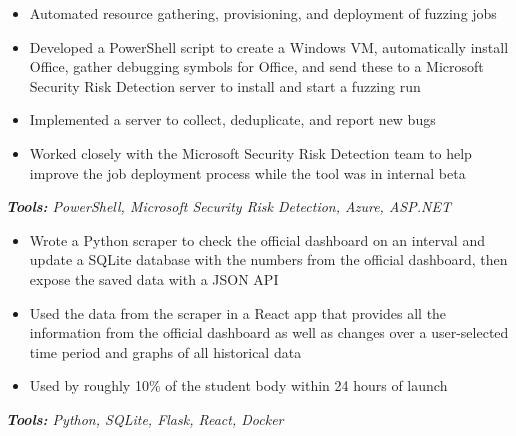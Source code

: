 \documentclass[10pt,letter]{altacv}
\begin{document}
\begin{itemize}
\item Automated resource gathering, provisioning, and deployment of fuzzing jobs
\item Developed a PowerShell script to create a Windows VM, automatically install Office, gather debugging symbols for Office, and send these to a Microsoft \\ Security Risk Detection server to install and start a fuzzing run
\item Implemented a server to collect, deduplicate, and report new bugs
\item Worked closely with the Microsoft Security Risk Detection team to help improve the job deployment process while the tool was in internal beta
\end{itemize}
\textit{\textbf{Tools:} PowerShell, Microsoft Security Risk Detection, Azure, ASP.NET}

\smallskip 




\begin{itemize}
\item Wrote a Python scraper to check the official dashboard on an interval and update a SQLite database with the numbers from the official dashboard, then expose the saved data with a JSON API
\item Used the data from the scraper in a React app that provides all the information from the official dashboard as well as changes over a user-selected time period and graphs of all historical data
\item Used by roughly 10\% of the student body within 24 hours of launch
\end{itemize}
\textit{\textbf{Tools:} Python, SQLite, Flask, React, Docker}
\end{document}
